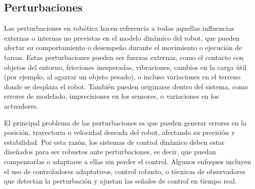 \subsection{Perturbaciones}
Las perturbaciones en robótica hacen referencia a todas aquellas influencias externas o internas no previstas en el modelo dinámico del robot, que pueden afectar su comportamiento o desempeño durante el movimiento o ejecución de tareas. Estas perturbaciones pueden ser fuerzas externas, como el contacto con objetos del entorno, fricciones inesperadas, vibraciones, cambios en la carga útil (por ejemplo, al agarrar un objeto pesado), o incluso variaciones en el terreno donde se desplaza el robot. También pueden originarse dentro del sistema, como errores de modelado, imprecisiones en los sensores, o variaciones en los actuadores.

El principal problema de las perturbaciones es que pueden generar errores en la posición, trayectoria o velocidad deseada del robot, afectando su precisión y estabilidad. Por esta razón, los sistemas de control dinámico deben estar diseñados para ser robustos ante perturbaciones, es decir, que puedan compensarlas o adaptarse a ellas sin perder el control. Algunos enfoques incluyen el uso de controladores adaptativos, control robusto, o técnicas de observadores que detectan la perturbación y ajustan las señales de control en tiempo real.